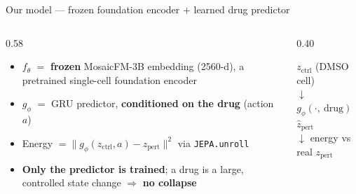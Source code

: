 \documentclass[aspectratio=169]{beamer}
\newcommand{\hl}[1]{\textcolor{accent}{\textbf{#1}}}
\newcommand{\hk}[1]{\textcolor{accent2}{\textbf{#1}}}
\begin{document}
\begin{frame}{Our model --- frozen foundation encoder $+$ learned drug predictor}
\vspace{4pt}
\begin{columns}[T]
\begin{column}{0.58\textwidth}\small
\begin{itemize}\setlength\itemsep{6pt}
  \item \hl{$f_\theta$} $=$ \textbf{frozen} MosaicFM-3B embedding (2560-d), a pretrained single-cell foundation encoder
  \item \hl{$g_\phi$} $=$ GRU predictor, \hl{conditioned on the drug} (action $a$)
  \item Energy $=\lVert g_\phi(z_{\text{ctrl}}, a) - z_{\text{pert}}\rVert^2$ via \texttt{JEPA.unroll}
  \item \hk{Only the predictor is trained}; a drug is a large, controlled state change $\Rightarrow$ \hk{no collapse}
\end{itemize}
\end{column}
\begin{column}{0.40\textwidth}
\begin{card2}[Pipeline]
\footnotesize
$z_{\text{ctrl}}$ \textcolor{muted}{(DMSO cell)}\\[3pt]
$\downarrow$\; $g_\phi(\cdot,\ \text{drug})$\\[3pt]
$\hat z_{\text{pert}}$\\[3pt]
$\downarrow$\; energy vs real $z_{\text{pert}}$
\end{card2}
\end{column}
\end{columns}
\end{frame}
\end{document}
